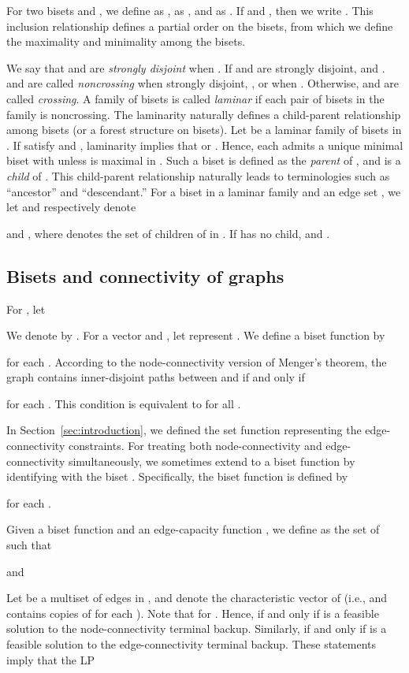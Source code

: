 \documentclass{article}
\begin{document}
For two bisets  and , we define  as ,  as , and  as 
. 
If  and , then we write . 
This inclusion relationship defines a partial order on the bisets, from which
we define the maximality and minimality among the bisets.

We say that  and  are 
\emph{strongly disjoint} when .
 If  and  are strongly disjoint,  and 
 .
 and  are called \emph{noncrossing} when strongly disjoint,
, 
or when .
Otherwise,  and  are called \emph{crossing}.
A family of bisets is called \emph{laminar} if each pair of bisets in the family is noncrossing.
The laminarity naturally defines a child-parent relationship among bisets (or a forest structure on
bisets). Let  be a laminar family of bisets in . If  satisfy  and , laminarity implies
that  or . 
Hence, each  admits a unique minimal biset  with 
unless  is maximal in . Such a biset  is defined as the \emph{parent} of 
, and  is a \emph{child} of 
. This child-parent relationship
naturally leads to terminologies such as ``ancestor'' and ``descendant.'' 
For a biset  in a laminar family  and an edge set , 
we let  
and  
 respectively denote 

and 
, where 
denotes the set of children of  in .
If  has no child, 
 and
.


\subsection{Bisets and connectivity of graphs}

For , let 

We denote  by .
For a vector  and , 
let  represent .
We define a biset function  by
 
for each .
According to the node-connectivity version of Menger's theorem, 
the graph  contains  inner-disjoint paths between  and 
if and only if
 
for each .
This condition is equivalent to 
for all .

In Section~\ref{sec:introduction},
we defined the set function  representing 
the edge-connectivity constraints.
For treating both node-connectivity and edge-connectivity simultaneously,
we sometimes extend
 to a biset function by
identifying  with the biset .
Specifically, the biset function  is defined by

for each .

Given a biset function  and 
an edge-capacity function
,
we define  as the set of 
 such that 

and 


Let  be a multiset of edges in , and  denote the characteristic vector of 
(i.e.,  and  contains  copies of  for each ).
Note that  for .
Hence, 
if and only if  is a feasible solution
to the node-connectivity terminal backup.
Similarly, 
if and only if  is a feasible solution 
to the edge-connectivity terminal backup.
These statements imply that the LP 
 
\end{document}
